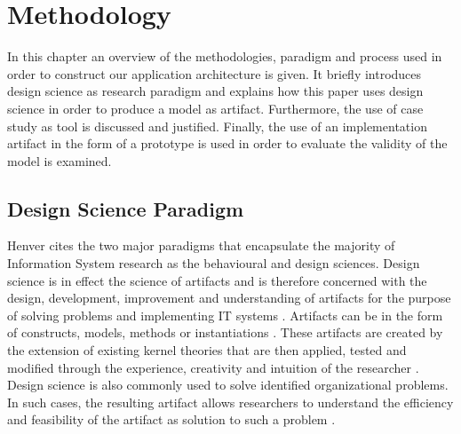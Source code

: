\chapter{Methodology}

In this chapter an overview of the methodologies, paradigm and process used in order to construct our application architecture is given. It briefly introduces design science as research paradigm and explains how this paper uses design science in order to produce a model as artifact. Furthermore, the use of case study as tool is discussed and justified. Finally, the use of an implementation artifact in the form of a prototype is used in order to evaluate the validity of the model is examined.

\section{Design Science Paradigm}
Henver \cite{Hevner2004a} cites the two major paradigms that encapsulate the majority of Information System research as the behavioural and design sciences. Design science is in effect the science of artifacts and is therefore concerned with the design, development, improvement and understanding of artifacts for the purpose of solving problems and implementing IT systems \cite{March1995a}. Artifacts can be in the form of constructs, models, methods or instantiations \cite{Hevner2004a}.  These artifacts are created by the extension of existing kernel theories that are then applied, tested and modified through the experience, creativity and intuition of the researcher \cite{Walls1992}. Design science is also commonly used to solve identified organizational problems. In such cases, the resulting artifact allows researchers to understand the efficiency and feasibility of the artifact as solution to such a problem \cite{Hevner2004a}. 

